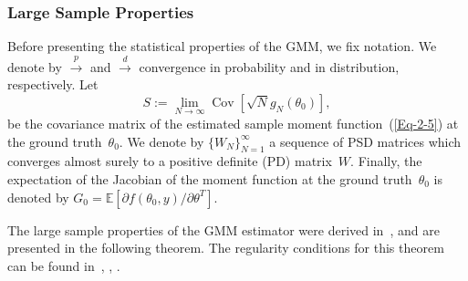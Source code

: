 \documentclass{article}
\newcommand{\E}[0]{\mathbb{E}}
\newcommand{\Cov}[0]{\operatorname{Cov}}
\begin{document}
\subsubsection{Large Sample Properties}\label{gmm:large}
Before presenting the statistical properties of the GMM, we fix notation. We denote by $\overset{p}{\to}$ and $\overset{d}{\to}$ convergence in  probability and in distribution, respectively. Let
\begin{equation} \label{eqn:cov_mat_S}
	S := \lim_{N\to \infty}\Cov\left[\sqrt{N}g_N(\theta_0)\right],
\end{equation}
be the covariance matrix of the estimated sample moment function~(\ref{Eq-2-5}) at the ground truth~$\theta_0$. We denote by $\{W_N\}_{N=1}^\infty$ a sequence of PSD matrices which converges almost surely to a positive definite (PD) matrix~$W$. Finally, the expectation of the Jacobian of the moment function at the ground truth~$\theta_0$ is denoted by $G_0 = \E\left[\partial f(\theta_0, y) / \partial \theta^T\right]$.

The large sample properties of the GMM estimator were derived in~\cite{Hansen1982}, and are presented in the following theorem. The regularity conditions for this theorem can be found in~\cite{Hansen1982}, \cite{Hall2005}, \cite{abas2021generalized}.
\end{document}
